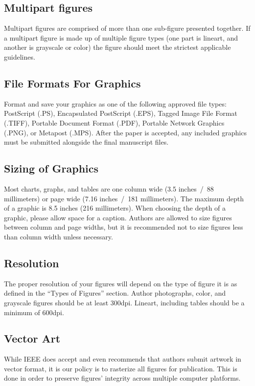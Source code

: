 \documentclass[journal,twoside,web]{ieeecolor}
\begin{document}
\subsection{Multipart figures}
Multipart figures are comprised of more than one sub-figure presented together.
If a multipart figure is made up of multiple figure types (one part is lineart,
and another is grayscale or color) the figure should meet the strictest applicable guidelines.

\subsection{File Formats For Graphics}
\label{formats}
Format and save your graphics as one of the following approved file types:
PostScript (.PS), Encapsulated PostScript (.EPS), Tagged Image File Format (.TIFF),
Portable Document Format (.PDF), Portable Network Graphics (.PNG), or Metapost (.MPS).
After the paper is accepted, any included graphics must be submitted alongside the final manuscript files.

\subsection{Sizing of Graphics}
Most charts, graphs, and tables are one column wide (3.5 inches~/~88
millimeters) or page wide (7.16 inches~/~181 millimeters). The maximum
depth of a graphic is 8.5 inches (216 millimeters). When choosing the depth of a graphic,
please allow space for a caption. Authors are allowed to size figures between column and
page widths, but it is recommended not to size figures less than column width unless necessary.

\subsection{Resolution}
The proper resolution of your figures will depend on the type of figure it
is as defined in the ``Types of Figures'' section. Author photographs,
color, and grayscale figures should be at least 300dpi. Lineart, including
tables should be a minimum of 600dpi.

\subsection{Vector Art}
While IEEE does accept and even recommends that authors submit artwork
in vector format, it is our policy is to rasterize all figures for publication. This is done
in order to preserve figures' integrity across multiple computer platforms.
\end{document}
